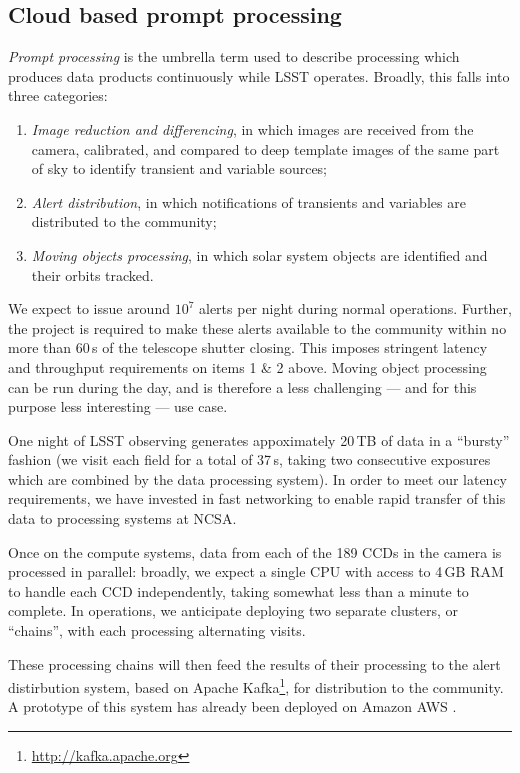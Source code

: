 \subsection{Cloud based prompt processing}\label{sect:pp}

\textit{Prompt processing}  is the umbrella term used to describe processing which produces data products continuously while LSST operates.
Broadly, this falls into three categories:

\begin{enumerate}

\item{\textit{Image reduction and differencing}, in which images are received from the camera, calibrated, and compared to deep template images of the same part of sky to identify transient and variable sources;}
\item{\textit{Alert distribution}, in which notifications of transients and variables are distributed to the community;}
\item{\textit{Moving objects processing}, in which solar system objects are identified and their orbits tracked.}

\end{enumerate}

We expect to issue around $10^7$ alerts per night during normal operations.
Further, the project is required to make these alerts available to the community within no more than 60\,s of the telescope shutter closing.
This imposes stringent latency and throughput requirements on items 1 \& 2 above.
Moving object processing can be run during the day, and is therefore a less challenging — and for this purpose less interesting — use case.

One night of LSST observing generates appoximately 20\,TB of data in a ``bursty'' fashion (we visit each field for a total of 37\,s, taking two consecutive exposures which are combined by the data processing system).
In order to meet our latency requirements, we have invested in fast networking to enable rapid transfer of this data to processing systems at NCSA.

Once on the compute systems, data from each of the 189 CCDs in the camera is processed in parallel: broadly, we expect a single CPU with access to 4\,GB RAM to handle each CCD independently, taking somewhat less than a minute to complete.
In operations, we anticipate deploying two separate clusters, or ``chains'', with each processing alternating visits.

These processing chains will then feed the results of their processing to the alert distirbution system, based on Apache Kafka\footnote{\url{http://kafka.apache.org}}, for distribution to the community.
A prototype of this system has already been deployed on Amazon AWS .

